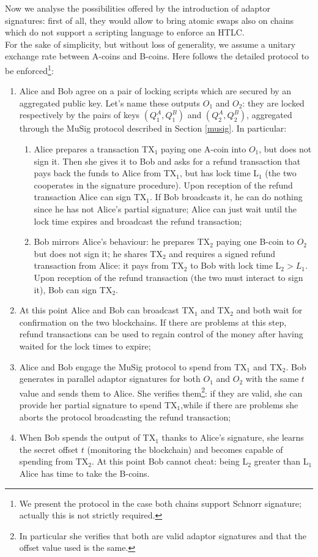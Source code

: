 \bigskip
\noindent
Now we analyse the possibilities offered by the introduction of adaptor signatures: first of all, they would allow to bring atomic swaps also on chains which do not support a scripting language to enforce an HTLC. 
\\
For the sake of simplicity, but without loss of generality, we assume a unitary exchange rate between A-coins and B-coins. Here follows the detailed protocol to be enforced\footnote{We present the protocol in the case both chains support Schnorr signature; actually this is not strictly required.}:
\begin{enumerate}
	\item Alice and Bob agree on a pair of locking scripts which are secured by an aggregated public key. Let's name these outputs $O_1$ and $O_2$: they are locked respectively by the pairs of keys $(Q_1^A, Q_1^B)$ and $(Q_2^A, Q_2^B)$, aggregated through the MuSig protocol described in Section \ref{musig}. In particular:
	\begin{enumerate}
		\item Alice prepares a transaction TX$_1$ paying one A-coin into $O_1$, but does not sign it. Then she gives it to Bob and asks for a refund transaction that pays back the funds to Alice from TX$_1$, but has lock time L$_1$ (the two cooperates in the signature procedure). Upon reception of the refund transaction Alice can sign TX$_1$. If Bob broadcasts it, he can do nothing since he has not Alice's partial signature; Alice can just wait until the lock time expires and broadcast the refund transaction;
		\item Bob mirrors Alice's behaviour: he prepares TX$_2$ paying one B-coin to $O_2$ but does not sign it; he shares TX$_2$ and requires a signed refund transaction from Alice: it pays from TX$_2$ to Bob with lock time L$_2 > L_1$. Upon reception of the refund transaction (the two must interact to sign it), Bob can sign TX$_2$.
	\end{enumerate}
	\item At this point Alice and Bob can broadcast TX$_1$ and TX$_2$ and both wait for confirmation on the two blockchains. If there are problems at this step, refund transactions can be used to regain control of the money after having waited for the lock times to expire;
	\item Alice and Bob engage the MuSig protocol to spend from TX$_1$ and TX$_2$. Bob generates in parallel adaptor signatures for both $O_1$ and $O_2$ with the same $t$ value and sends them to Alice. She verifies them\footnote{In particular she verifies that both are valid adaptor signatures and that the offset value used is the same.}: if they are valid, she can provide her partial signature to spend TX$_1$,while if there are problems she aborts the protocol broadcasting the refund transaction;
	\item When Bob spends the output of TX$_1$ thanks to Alice's signature, she learns the secret offset $t$ (monitoring the blockchain) and becomes capable of spending from TX$_2$. At this point Bob cannot cheat: being L$_2$ greater than L$_1$ Alice has time to take the B-coins.
\end{enumerate}
